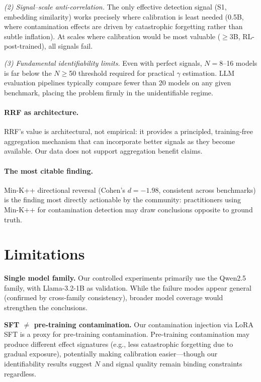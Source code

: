 \documentclass[11pt,a4paper]{article}
\begin{document}
\emph{(2) Signal--scale anti-correlation.}
The only effective detection signal (S1, embedding similarity) works precisely where calibration is least needed (0.5B, where contamination effects are driven by catastrophic forgetting rather than subtle inflation).
At scales where calibration would be most valuable ($\geq$3B, RL-post-trained), all signals fail.

\emph{(3) Fundamental identifiability limits.}
Even with perfect signals, $N=8$--16 models is far below the $N\geq$50 threshold required for practical $\gamma$ estimation.
LLM evaluation pipelines typically compare fewer than 20 models on any given benchmark, placing the problem firmly in the unidentifiable regime.

\paragraph{RRF as architecture.}
RRF's value is architectural, not empirical: it provides a principled, training-free aggregation mechanism that can incorporate better signals as they become available.
Our data does not support aggregation benefit claims.

\paragraph{The most citable finding.}
Min-K++ directional reversal (Cohen's $d=-1.98$, consistent across benchmarks) is the finding most directly actionable by the community: practitioners using Min-K++ for contamination detection may draw conclusions opposite to ground truth.

\section{Limitations}
\label{sec:limitations}

\textbf{Single model family.}
Our controlled experiments primarily use the Qwen2.5 family, with Llama-3.2-1B as validation.
While the failure modes appear general (confirmed by cross-family consistency), broader model coverage would strengthen the conclusions.

\textbf{SFT $\neq$ pre-training contamination.}
Our contamination injection via LoRA SFT is a proxy for pre-training contamination.
Pre-training contamination may produce different effect signatures (e.g., less catastrophic forgetting due to gradual exposure), potentially making calibration easier---though our identifiability results suggest $N$ and signal quality remain binding constraints regardless.
\end{document}
